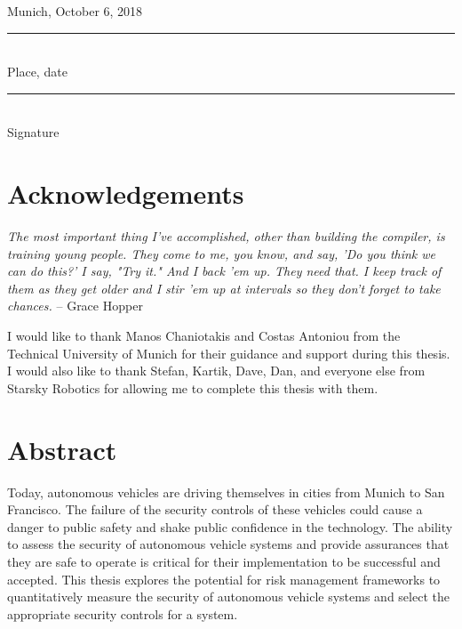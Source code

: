 \documentclass{article}
\begin{document}
\vspace{3.5cm}

  \parbox{\textwidth}{
    \parbox{7cm}{
    Munich, October 6, 2018\\
      \rule{6cm}{1pt}\\
       Place, date
    }
    \parbox{7cm}{
      \vspace{10.2mm}
      \rule{6cm}{1pt}\\
      Signature
    }
  }

\newpage
\section*{Acknowledgements}

\begin{mdframed}
    \emph{The most important thing I've accomplished, other than building the compiler, is training young people. They come to me, you know, and say, 'Do you think we can do this?' I say, "Try it." And I back 'em up. They need that. I keep track of them as they get older and I stir 'em up at intervals so they don't forget to take chances.} -- Grace Hopper \citep{lynn_particular_2012}
\end{mdframed}

\noindent I would like to thank Manos Chaniotakis and Costas Antoniou from the Technical University of Munich for their guidance and support during this thesis. I would also like to thank Stefan, Kartik, Dave, Dan, and everyone else from Starsky Robotics for allowing me to complete this thesis with them.

\newpage
\section*{Abstract}

Today, autonomous vehicles are driving themselves in cities from Munich to San Francisco. The failure of the security controls of these vehicles could cause a danger to public safety and shake public confidence in the technology. The ability to assess the security of autonomous vehicle systems and provide assurances that they are safe to operate is critical for their implementation to be successful and accepted. This thesis explores the potential for risk management frameworks to quantitatively measure the security of autonomous vehicle systems and select the appropriate security controls for a system.
\end{document}
